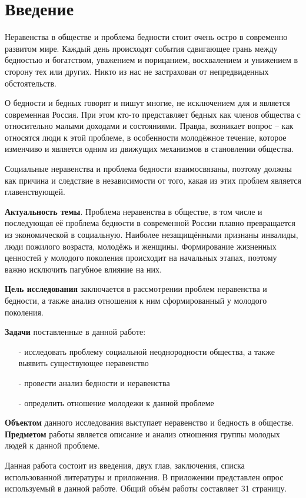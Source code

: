 \section*{Введение}

Неравенства в обществе и проблема бедности стоит очень остро в современно 
развитом мире. Каждый день происходят события сдвигающее грань между бедностью 
и богатством, уважением и порицанием, восхвалением и унижением в сторону тех 
или других. Никто из нас не застрахован от непредвиденных обстоятельств.

О бедности и бедных говорят и пишут многие, не исключением для и является 
современная Россия. При этом кто-то представляет бедных как членов общества с 
относительно малыми доходами и состояниями. Правда, возникает вопрос -- 
как относятся люди к этой проблеме, в особенности молодёжное течение, которое 
изменчиво и является одним из движущих механизмов в становлении общества.

Социальные неравенства и проблема бедности взаимосвязаны, поэтому должны как 
причина и следствие в независимости от того, какая из этих проблем является 
главенствующей.

\textbf{Актуальность темы}. Проблема неравенства в обществе, в том числе и 
последующая её проблема бедности в современной России плавно превращается из 
экономической в социальную. Наиболее незащищёнными признаны инвалиды, люди 
пожилого возраста, молодёжь и женщины. Формирование жизненных ценностей у 
молодого поколения происходит на начальных этапах, поэтому важно исключить 
пагубное влияние на них.

\textbf{Цель исследования} заключается в рассмотрении проблем неравенства и 
бедности, а также анализ отношения к ним сформированный у молодого поколения.  

\textbf{Задачи} поставленные в данной работе:
\begin{itemize}
    \item[-] исследовать проблему социальной неоднородности общества, а также 
        выявить существующее неравенство
    \item[-] провести анализ бедности и неравенства
    \item[-] определить отношение молодежи к данной проблеме
\end{itemize}

\textbf{Объектом} данного исследования выступает неравенство и бедность в 
обществе. \textbf{Предметом} работы является описание и анализ отношения 
группы молодых людей к данной проблеме.

Данная работа состоит из введения, двух глав, заключения, списка использованной 
литературы и приложения. В приложении представлен опрос используемый в данной 
работе. Общий объём работы составляет 31 страницу.

\newpage